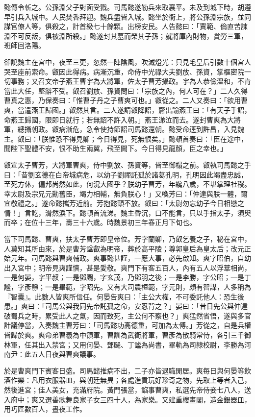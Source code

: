 懿傳令斬之。公孫淵父子對面受戮。司馬懿遂勒兵來取襄平。未及到城下時，胡遵早引兵入城中。人民焚香拜迎。魏兵盡皆入城。懿坐於衙上，將公孫淵宗族，並同謀官僚人等，俱殺之，計首級七十餘顆。出榜安民。人告懿曰：「賈範、倫直苦諫淵不可反叛，俱被淵所殺。」懿遂封其墓而榮其子孫；就將庫內財物，賞勞三軍，班師回洛陽。

卻說魏主在宮中，夜至三更，忽然一陣陰風，吹滅燈光：只見毛皇后引數十個宮人哭至座前索命。叡因此得病。病漸沉重，命侍中光祿大夫劉放、孫資，掌樞密院一切事務；又召文帝子燕王曹宇為大將軍，佐太子曹芳攝政。宇為人恭儉溫和，不肯當此大任，堅辭不受。叡召劉放、孫資問曰：「宗族之內，何人可在？」二人久得曹真之惠，乃保奏曰：「惟曹子丹之子曹爽可也。」叡從之。二人又奏曰：「欲用曹爽，當遣燕王歸國。」叡然其言。二人遂請叡降詔，齎出諭燕王曰：「有天子手詔，命燕王歸國，限即日就行；若無詔不許入朝。」燕王涕泣而去。遂封曹爽為大將軍，總攝朝政。叡病漸危，急令使持節詔司馬懿還朝。懿受命逕到許昌，入見魏主。叡曰：「朕惟恐不得見卿；今日得見，死無恨矣。」懿頓首奏曰：「臣在途中，聞陛下聖體不安，恨不助生兩翼，飛至闕下。今日得見龍顏，臣之幸也。」

叡宣太子曹芳，大將軍曹爽，侍中劉放、孫資等，皆至御榻之前。叡執司馬懿之手曰：「昔劉玄德在白帝城病危，以幼子劉禪託孤於諸葛孔明，孔明因此竭盡忠誠，至死方休，偏邦尚然如此，何況大國乎？朕幼子曹芳，年纔八歲，不堪掌理社稷。幸太尉及宗兄元勳舊臣，竭力相輔，無負朕心！」又喚芳曰：「仲達與朕一體，爾宜敬禮之。」遂命懿攜芳近前。芳抱懿頸不放。叡曰：「太尉勿忘幼子今日相戀之情！」言訖，潸然淚下。懿頓首流涕。魏主昏沉，口不能言，只以手指太子，須臾而卒；在位十三年，壽三十六歲。時魏景初三年春正月下旬也。

當下司馬懿、曹爽，扶太子曹芳即皇帝位。芳字蘭卿，乃叡乞養之子，秘在宮中，人莫知其所由來，於是曹芳諡叡為明帝，葬於高平陵；尊郭皇后為皇太后；改元正始元年。司馬懿與曹爽輔政。爽事懿甚謹，一應大事，必先啟知。爽字昭伯，自幼出入宮中；明帝見爽謹慎，甚是愛敬。爽門下有客五百人，內有五人以浮華相尚，一是何晏，字平叔；一是鄧颺，字玄茂，乃鄧羽之後；一是李勝，字公昭；一是丁謐，字彥靜；一是畢範，字昭先。又有大司農桓範，字元則，頗有智謀，人多稱為『智囊』。此數人皆爽所信任。何晏告爽曰：「主公大權，不可委託他人：恐生後患。」爽曰：「司馬公與我同先帝託孤之命，安忍背之？」晏曰：「昔日先公與仲達破蜀兵之時，累受此人之氣，因而致死，主公何不察也？」爽猛然省悟，遂與多官計議停當，入奏魏主曹芳曰：「司馬懿功高德重，可加為太傅。」芳從之，自是兵權皆歸於爽。爽命弟曹羲為中領軍，曹訓為武衛將軍，曹彥為散騎常侍，各引三千御林軍，任其出入禁宮；又用何晏、鄧颺、丁謐為尚書，畢軌為司隸校尉，李勝為河南尹：此五人日夜與曹爽議事。

於是曹爽門下賓客日盛。司馬懿推病不出，二子亦皆退職閒居。爽每日與何晏等飲酒作樂：凡用衣服器皿，與朝廷無異；各處進貢玩好珍奇之物，先取上等者入己，然後進宮；佳人美女，充滿府院。黃門張當，諂事曹爽，私選先帝侍妾七八人，送入府中；爽又選善歌舞良家子女三四十人，為家樂。又建重樓畫閣，造金銀器皿，用巧匠數百人，晝夜工作。

